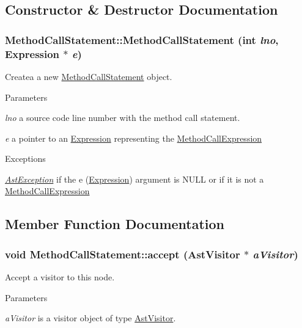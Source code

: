 \subsection{Constructor \& Destructor Documentation}
\hypertarget{classMethodCallStatement_aa0ebf89fb7b2a464aed2685070578279}{
\subsubsection[{MethodCallStatement}]{\setlength{\rightskip}{0pt plus 5cm}MethodCallStatement::MethodCallStatement (int {\em lno}, \/  {\bf Expression} $\ast$ {\em e})}}
\label{classMethodCallStatement_aa0ebf89fb7b2a464aed2685070578279}
Createa a new \hyperlink{classMethodCallStatement}{MethodCallStatement} object.


\begin{DoxyParams}{Parameters}
\item[{\em lno}]a source code line number with the method call statement. \item[{\em e}]a pointer to an \hyperlink{classExpression}{Expression} representing the \hyperlink{classMethodCallExpression}{MethodCallExpression} \end{DoxyParams}

\begin{DoxyExceptions}{Exceptions}
\item[{\em \hyperlink{classAstException}{AstException}}]if the e (\hyperlink{classExpression}{Expression}) argument is NULL or if it is not a \hyperlink{classMethodCallExpression}{MethodCallExpression} \end{DoxyExceptions}


\subsection{Member Function Documentation}
\hypertarget{classMethodCallStatement_a4bbae8f172868a47ba651f436087e16f}{
\subsubsection[{accept}]{\setlength{\rightskip}{0pt plus 5cm}void MethodCallStatement::accept ({\bf AstVisitor} $\ast$ {\em aVisitor})}}
\label{classMethodCallStatement_a4bbae8f172868a47ba651f436087e16f}
Accept a visitor to this node. 
\begin{DoxyParams}{Parameters}
\item[{\em aVisitor}]is a visitor object of type \hyperlink{classAstVisitor}{AstVisitor}. \end{DoxyParams}


